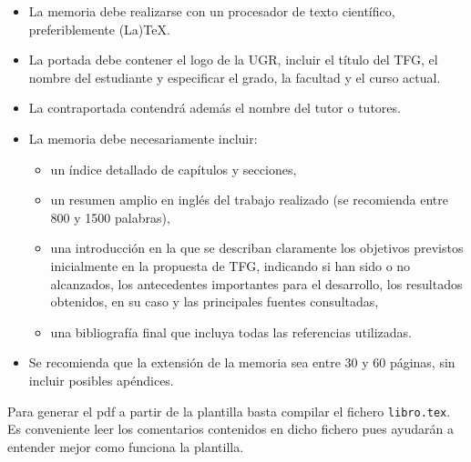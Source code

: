 \begin{itemize}
  \item La  memoria  debe  realizarse  con  un  procesador  de  texto  científico,  preferiblemente (La)TeX.
  \item La portada  debe contener  el  logo  de  la UGR,  incluir  el  título del TFG, el nombre del estudiante y especificar el grado, la facultad y el curso actual.
  \item La contraportada contendrá además el nombre del tutor o tutores.
  \item La memoria debe necesariamente incluir:
    \begin{itemize}
      \item un índice detallado de capítulos y secciones,
      \item un resumen amplio en inglés del trabajo realizado (se recomienda entre 800 y 1500 palabras),
      \item una introducción en la que se describan claramente los objetivos previstos inicialmente en la propuesta de TFG, indicando si han sido o no alcanzados, los antecedentes importantes para el desarrollo, los resultados obtenidos, en su caso y las principales fuentes consultadas,
      \item una bibliografía final que incluya todas las referencias utilizadas.
    \end{itemize}
  \item Se recomienda que la extensión de la memoria sea entre 30 y 60 páginas, sin incluir posibles apéndices.
\end{itemize}

Para generar el pdf a partir de la plantilla basta compilar el fichero \texttt{libro.tex}. Es conveniente leer los comentarios contenidos en dicho fichero pues ayudarán a entender mejor como funciona la plantilla. 


